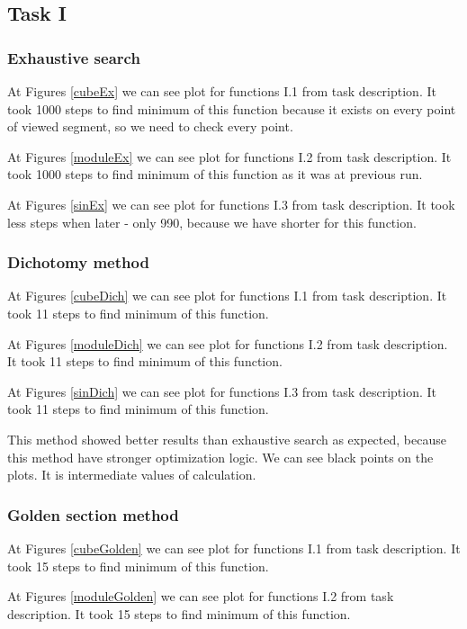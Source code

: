 \documentclass[a4paper,article,14pt]{extarticle}
\begin{document}
	\subsection{Task I}
	\subsubsection{Exhaustive search}
	
	At Figures \ref{cubeEx} we can see plot for functions I.1 from task description. It took 1000 steps to find minimum of this function because it exists on every point of viewed segment, so we need to check every point.
	
	At Figures \ref{moduleEx} we can see plot for functions I.2 from task description. It took 1000 steps to find minimum of this function as it was at previous run. 
	
	At Figures \ref{sinEx} we can see plot for functions I.3 from task description. It took less steps when later - only 990, because we have shorter for this function.
	
	\subsubsection{Dichotomy method}
	At Figures \ref{cubeDich} we can see plot for functions I.1 from task description. It took 11 steps to find minimum of this function.
	
	At Figures \ref{moduleDich} we can see plot for functions I.2 from task description. It took 11 steps to find minimum of this function.
	
	At Figures \ref{sinDich} we can see plot for functions I.3 from task description. It took 11 steps to find minimum of this function.
	
	This method showed better results than exhaustive search as expected, because this method have stronger optimization logic. We can see black points on the plots. It is intermediate values of calculation. 
	
	\subsubsection{Golden section method}
	At Figures \ref{cubeGolden} we can see plot for functions I.1 from task description. It took 15 steps to find minimum of this function.
	
	At Figures \ref{moduleGolden} we can see plot for functions I.2 from task description. It took 15 steps to find minimum of this function.
	
\end{document}
